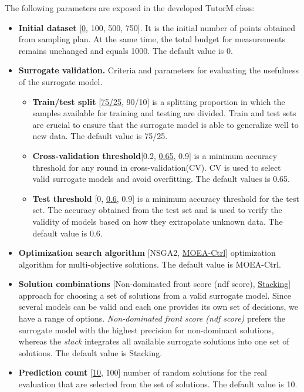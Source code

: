     The following parameters are exposed in the developed TutorM class:
    \begin{itemize}
        \item \textbf{Initial dataset} [\underline{0}, 100, 500, 750]. It is the initial number of points obtained from sampling plan. At the same time, the total budget for measurements remains unchanged and equals 1000. The default value is 0.
        \item \textbf{Surrogate validation.} Criteria and parameters for evaluating the usefulness of the surrogate model.
            \begin{itemize}
                \item \textbf{Train/test split} [\underline{75/25}, 90/10] is a splitting proportion in which the samples available for training and testing are divided. Train and test sets are crucial to ensure that the surrogate model is able to generalize well to new data. The default value is 75/25.
                \item \textbf{Cross-validation threshold}[0.2, \underline{0.65}, 0.9] is a minimum accuracy threshold for any round in cross-validation(CV). CV is used to select valid surrogate models and avoid overfitting. The default values is 0.65.
                \item \textbf{Test threshold} [0, \underline{0.6}, 0.9] is a minimum accuracy threshold for the test set. The accuracy obtained from the test set and is used to verify the validity of models based on how they extrapolate unknown data. The default value is 0.6.
            \end{itemize}
    \item \textbf{Optimization search algorithm} [NSGA2, \underline{MOEA-Ctrl}] optimization algorithm for multi-objective solutions. The default value is MOEA-Ctrl.
    \item \textbf{Solution combinations} [Non-dominated front score (ndf score), \underline{Stacking}] approach for choosing a set of solutions from a valid surrogate model. Since several models can be valid and each one provides its own set of decisions, we have a range of options. \emph{Non-dominated front score (ndf score)} prefers the surrogate model with the highest precision for non-dominant solutions, whereas the \emph{stack} integrates all available surrogate solutions into one set of solutions. The default value is Stacking.
    \item \textbf{Prediction count} [\underline{10}, 100] number of random solutions for the real evaluation that are selected from the set of solutions. The default value is 10.
    \end{itemize}

